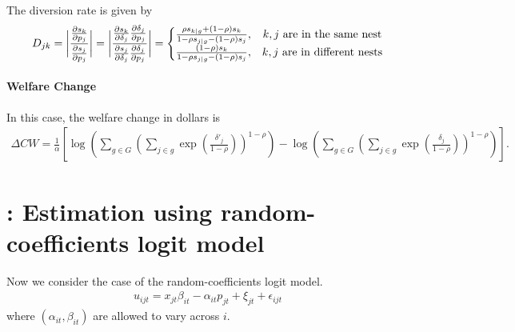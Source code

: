 \documentclass[11pt]{elegantbook}
\begin{document}
The diversion rate is given by
\begin{equation}
    \begin{aligned}
        D_{jk}=\bigg|\frac{\frac{\partial s_{k}}{\partial p_j}}{\frac{\partial s_{j}}{\partial p_j}}\bigg|=\bigg|\frac{\frac{\partial s_{k}}{\partial \delta_j}\frac{\partial \delta_j}{\partial p_j}}{\frac{\partial s_{j}}{\partial \delta_j}\frac{\partial \delta_{j}}{\partial p_j}}\bigg|=
        \left\{\begin{matrix}
            \frac{\rho s_{k|g} + (1-\rho)s_k}{1-\rho s_{j|g}-(1-\rho)s_j},& \textnormal{$k,j$ are in the same nest}\\
            \frac{(1-\rho)s_k}{1-\rho s_{j|g}-(1-\rho)s_j},& \textnormal{$k,j$ are in different nests}\\
        \end{matrix}\right.
    \end{aligned}
    \nonumber
\end{equation}

\paragraph*{Welfare Change}
In this case, the welfare change in dollars is
\begin{equation}
    \begin{aligned}
        \Delta CW=\frac{1}{\alpha}\left[\log\left(\sum_{g\in G}\left(\sum_{j\in g}\exp\left(\frac{\delta'_j}{1-\rho}\right)\right)^{1-\rho}\right)-\log\left(\sum_{g\in G}\left(\sum_{j\in g}\exp\left(\frac{\delta_j}{1-\rho}\right)\right)^{1-\rho}\right)\right].
    \end{aligned}
    \nonumber
\end{equation}











\section{\cite{berry1995automobile}: Estimation using random-coefficients logit model}
Now we consider the case of the random-coefficients logit model.
\begin{equation}
    \begin{aligned}
        u_{ijt}=x_{jt}\beta_{it}-\alpha_{it}p_{jt}+\xi_{jt}+\epsilon_{ijt}
    \end{aligned}
    \nonumber
\end{equation}
where $(\alpha_{it},\beta_{it})$ are allowed to vary across $i$.
\end{document}
